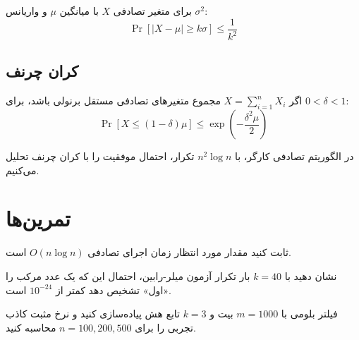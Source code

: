 \documentclass{matinbook}
\begin{document}
    \begin{theorem}
        برای متغیر تصادفی $X$ با میانگین $\mu$
        و واریانس $\sigma^{2}$:
        \[
        \Pr[|X - \mu| \geq k\sigma] \leq \frac{1}{k^{2}}
        \]
        \label{thm:chebyshev}
    \end{theorem}
    
    \subsection{کران چرنف}
    
    \begin{theorem}
        اگر $X = \sum_{i=1}^{n} X_{i}$
        مجموع متغیرهای تصادفی مستقل برنولی باشد،
        برای $0 < \delta < 1$:
        \[
        \Pr[X \leq (1-\delta)\mu] \leq
        \exp\left(-\frac{\delta^{2}\mu}{2}\right)
        \]
        \label{thm:chernoff}
    \end{theorem}
    
    \begin{example}
        در الگوریتم تصادفی کارگر،
        با $n^{2} \log n$ تکرار،
        احتمال موفقیت را با کران چرنف
        تحلیل می‌کنیم.
        \label{ex:chernoff-karger}
    \end{example}
    
    \section{تمرین‌ها}
    
    \begin{exercise}
        ثابت کنید مقدار مورد انتظار زمان اجرای
         تصادفی $O(n \log n)$ است.
        \label{exc:quicksort-expected}
    \end{exercise}
    
    \begin{exercise}
        نشان دهید با $k = 40$ بار تکرار
        آزمون میلر-رابین، احتمال این که
        یک عدد مرکب را «اول» تشخیص دهد
        کمتر از $10^{-24}$ است.
        \label{exc:miller-rabin-error}
    \end{exercise}
    
    \begin{exercise}
        فیلتر بلومی با $m = 1000$ بیت
        و $k = 3$ تابع هش پیاده‌سازی کنید
        و نرخ مثبت کاذب تجربی را
        برای $n = 100, 200, 500$ محاسبه کنید.
        \label{exc:bloom-empirical}
    \end{exercise}
    
\end{document}
